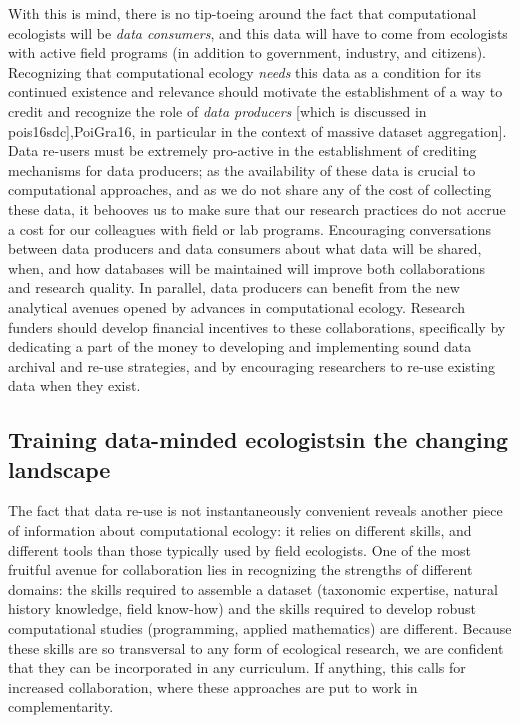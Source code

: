 \documentclass[11pt,serif]{article}
\begin{document}
With this is mind, there is no tip-toeing around the fact that
computational ecologists will be \emph{data consumers}, and this data
will have to come from ecologists with active field programs (in
addition to government, industry, and citizens). Recognizing that
computational ecology \emph{needs} this data as a condition for its
continued existence and relevance should motivate the establishment of a
way to credit and recognize the role of \emph{data producers} {[}which
is discussed in
\color{gray}{[}pois16sdc{]},\color{black}\color{purple}PoiGra16,\color{black}
in particular in the context of massive dataset aggregation{]}. Data
re-users must be extremely pro-active in the establishment of crediting
mechanisms for data producers; as the availability of these data is
crucial to computational approaches, and as we do not share any of the
cost of collecting these data, it behooves us to make sure that our
research practices do not accrue a cost for our colleagues with field or
lab programs. Encouraging conversations between data producers and data
consumers about what data will be shared, when, and how databases will
be maintained will improve both collaborations and research quality.
\color{purple}In parallel, data producers can\color{black}
\color{purple}benefit from the new analytical avenues opened by advances
in computational\color{black} \color{purple}ecology.\color{black}
Research funders should develop financial incentives to these
collaborations, specifically by dedicating a part of the money to
developing and implementing sound data archival and re-use strategies,
and by encouraging researchers to re-use existing data when they exist.

\subsection{\texorpdfstring{Training
\color{purple}data-minded\color{black} ecologists\color{gray}in the
changing
landscape\color{black}}{Training data-minded ecologistsin the changing landscape}}\label{training-data-minded-ecologistsin-the-changing-landscape}

The fact that data re-use is not instantaneously convenient reveals
another piece of information about computational ecology: it relies on
different skills, and different tools than those typically used by field
ecologists. One of the most fruitful avenue for collaboration lies in
recognizing the strengths of different domains: the skills required to
assemble a dataset (taxonomic expertise, natural history knowledge,
field know-how) and the skills required to develop robust computational
studies (programming, applied mathematics) are different.
\color{purple}Because these skills are so transversal to any form of
ecological\color{black} \color{purple}research, we are confident that
they can be incorporated in any curriculum.\color{black} If anything,
this calls for increased collaboration, where these approaches are put
to work in complementarity.
\end{document}

